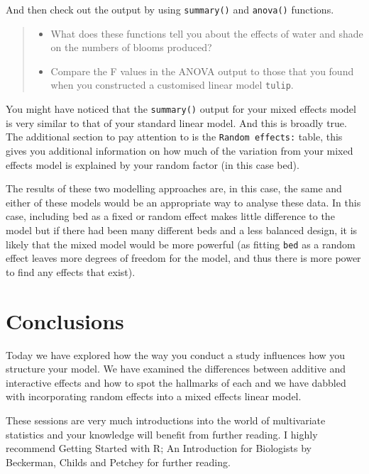 \documentclass[
]{book}
\providecommand{\tightlist}{%
  \setlength{\itemsep}{0pt}\setlength{\parskip}{0pt}}
\begin{document}
And then check out the output by using \texttt{summary()} and \texttt{anova()} functions.

\begin{quote}
\begin{itemize}
\tightlist
\item
  What does these functions tell you about the effects of water and shade on the numbers of blooms produced?
\item
  Compare the F values in the ANOVA output to those that you found when you constructed a customised linear model \texttt{tulip}.
\end{itemize}
\end{quote}

You might have noticed that the \texttt{summary()} output for your mixed effects model is very similar to that of your standard linear model. And this is broadly true. The additional section to pay attention to is the \texttt{Random\ effects:} table, this gives you additional information on how much of the variation from your mixed effects model is explained by your random factor (in this case bed).

The results of these two modelling approaches are, in this case, the same and either of these models would be an appropriate way to analyse these data. In this case, including bed as a fixed or random effect makes little difference to the model but if there had been many different beds and a less balanced design, it is likely that the mixed model would be more powerful (as fitting \texttt{bed} as a random effect leaves more degrees of freedom for the model, and thus there is more power to find any effects that exist).

\hypertarget{conclusions}{%
\section{Conclusions}\label{conclusions}}

Today we have explored how the way you conduct a study influences how you structure your model. We have examined the differences between additive and interactive effects and how to spot the hallmarks of each and we have dabbled with incorporating random effects into a mixed effects linear model.

These sessions are very much introductions into the world of multivariate statistics and your knowledge will benefit from further reading. I highly recommend Getting Started with R; An Introduction for Biologists by Beckerman, Childs and Petchey for further reading.
\end{document}
